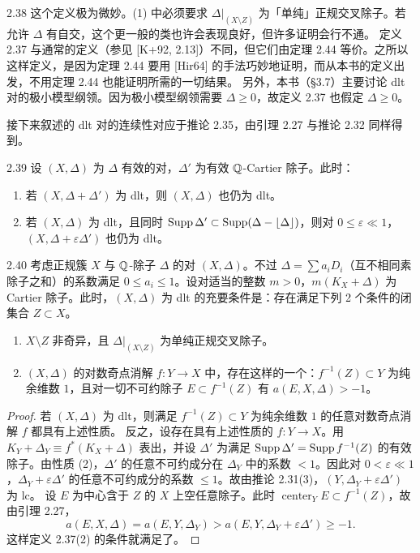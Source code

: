 \begin{remark}{2.38}
这个定义极为微妙。(1) 中必须要求 $\Delta|_{(X\setminus Z)}$ 为「单纯」正规交叉除子。若允许 $\Delta$ 有自交，这个更一般的类也许会表现良好，但许多证明会行不通。
定义 2.37 与通常的定义（参见 [K+92, 2.13]）不同，但它们由定理 2.44 等价。之所以这样定义，是因为定理 2.44 要用 [Hir64] 的手法巧妙地证明，而从本书的定义出发，不用定理 2.44 也能证明所需的一切结果。
另外，本书（§3.7）主要讨论 dlt 对的极小模型纲领。因为极小模型纲领需要 $\Delta\ge0$，故定义 2.37 也假定 $\Delta\ge0$。
\end{remark}


接下来叙述的 dlt 对的连续性对应于推论 2.35，由引理 2.27 与推论 2.32 同样得到。

\begin{corollary}{2.39}
设 $(X,\Delta)$ 为 $\Delta$ 有效的对，$\Delta'$ 为有效 $\mathbb{Q}$-Cartier 除子。此时：
\begin{enumerate}[label=（\arabic*）,leftmargin=2.6em,itemsep=1pt]
\item 若 $(X,\Delta+\Delta')$ 为 dlt，则 $(X,\Delta)$ 也仍为 dlt。
\item 若 $(X,\Delta)$ 为 dlt，且同时 $\operatorname{Supp}\Delta'\subset\operatorname{Supp}(\Delta-\lfloor\Delta\rfloor)$，则对 $0\le\varepsilon\ll1$，$(X,\Delta+\varepsilon\Delta')$ 也仍为 dlt。
\end{enumerate}
\end{corollary}

\begin{propositionp}{2.40}
考虑正规簇 $X$ 与 $\mathbb{Q}$-除子 $\Delta$ 的对 $(X,\Delta)$。不过 $\Delta=\sum a_iD_i$（互不相同素除子之和）的系数满足 $0\le a_i\le1$。设对适当的整数 $m>0$，$m(K_X+\Delta)$ 为 Cartier 除子。此时，$(X,\Delta)$ 为 dlt 的充要条件是：存在满足下列 2 个条件的闭集合 $Z\subset X$。
\begin{enumerate}[label=（\arabic*）,leftmargin=2.6em,itemsep=1pt]
\item $X\setminus Z$ 非奇异，且 $\Delta|_{(X\setminus Z)}$ 为单纯正规交叉除子。
\item $(X,\Delta)$ 的对数奇点消解 $f\colon Y\to X$ 中，存在这样的一个：$f^{-1}(Z)\subset Y$ 为纯余维数 $1$，且对一切不可约除子 $E\subset f^{-1}(Z)$ 有 $a(E,X,\Delta)>-1$。
\end{enumerate}
\end{propositionp}
\begin{proof}
若 $(X,\Delta)$ 为 dlt，则满足 $f^{-1}(Z)\subset Y$ 为纯余维数 $1$ 的任意对数奇点消解 $f$ 都具有上述性质。
反之，设存在具有上述性质的 $f\colon Y\to X$。用 $K_Y+\Delta_Y\equiv f^*(K_X+\Delta)$ 表出，并设 $\Delta'$ 为满足 $\operatorname{Supp}\Delta'=\operatorname{Supp} f^{-1}(Z)$ 的有效除子。由性质 (2)，$\Delta'$ 的任意不可约成分在 $\Delta_Y$ 中的系数 $<1$。因此对 $0<\varepsilon\ll1$，$\Delta_Y+\varepsilon\Delta'$ 的任意不可约成分的系数 $\le1$。故由推论 2.31(3)，$(Y,\Delta_Y+\varepsilon\Delta')$ 为 lc。
设 $E$ 为中心含于 $Z$ 的 $X$ 上空任意除子。此时 $\operatorname{center}_YE\subset f^{-1}(Z)$，故由引理 2.27，
\[
a(E,X,\Delta)=a(E,Y,\Delta_Y)>a(E,Y,\Delta_Y+\varepsilon\Delta')\ge-1.
\]
这样定义 2.37(2) 的条件就满足了。
\end{proof}

